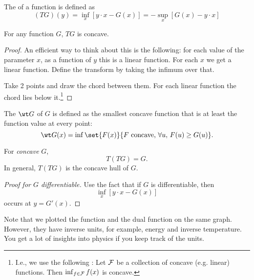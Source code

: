 \begin{df}
The  of a function is defined as
\[
(TG)(y) = \inf_x [y\cdot x - G(x)] = - \sup_x [G(x) - y\cdot x]
\]
\end{df}
\begin{thm}
For any function $G$, $TG$ is concave.
\end{thm}
\begin{proof}
An efficient way to think about this is the following: for each value of the parameter $x$, as a function of $y$ this is a linear function. For each $x$ we get a linear function. Define the transform by taking the infimum over that. 

Take 2 points and draw the chord between them. For each linear function the chord lies below it.\footnote{I.e., we use the following : Let $\cal F$ be a collection of concave (e.g. linear) functions. Then $\inf_{f\in \cal F}f(x)$ is concave.} 

\end{proof}
\begin{df}
The  $\wt G$ of $G$ is defined as the smallest concave function that is at least the function value at every point:
\[
\wt G(x)=\inf \set{F(x)}{F\text{ concave, }\forall u, \,F(u)\ge G(u)}.
\]
\end{df}


\begin{thm}
For \emph{concave} $G$,
\[
T(TG)=G.
\]
In general, $T(TG)$ is the concave hull of $G$. 
\end{thm}
\begin{proof}[Proof for $G$ differentiable]
Use the fact that if $G$ is differentiable, then
\[
\inf_x [y\cdot x - G(x)]
\]
occurs at $y=G'(x)$. %
\end{proof}

Note that we plotted the function and the dual function on the same graph. However, they have inverse units, for example, energy and inverse temperature. You get a lot of insights into physics if you keep track of the units.


